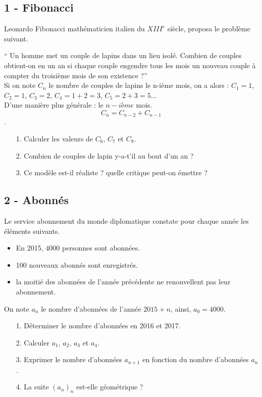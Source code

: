\documentclass[12pt]{article}
\begin{document}
\begin{multicols}{2}
\subsection*{1 - Fibonacci}

Leonardo Fibonacci mathématicien italien du $XIII^e$ siècle, proposa le problème suivant.

`` Un homme met un couple de lapins dans un lieu isolé. Combien de couples obtient-on en un an si chaque couple engendre tous les mois un nouveau couple à compter du troisième mois de son existence ?''\\

Si on note $C_n$ le nombre de couples de lapins le n-ième mois, on a alors : $C_1 = 1$, $C_2 = 1$, $C_3 = 2$, $C_4 = 1 + 2 = 3$, $C_5 = 2 + 3 = 5$...\\
D'une manière plus générale : le $n-ième$ mois.
$$C_n = C_{n-2} + C_{n-1}$$.

\begin{enumerate}
\item[1.] Calculer les valeurs de $C_6$, $C_7$ et $C_8$.
\item[2.] Combien de couples de lapin y-a-t'il au bout d'un an ?
\item[3.] Ce modèle est-il réaliste ? quelle critique peut-on émettre ?
\end{enumerate}

\noindent\hrulefill

\subsection*{2 - Abonnés}

Le service abonnement du monde diplomatique constate pour chaque année les éléments suivants.

\begin{itemize}
\item En 2015, $4000$ personnes sont abonnées.
\item 100 nouveaux abonnés sont enregistrés.
\item la moitié des abonnées de l’année précédente ne renouvellent pas leur abonnement.
\end{itemize}
On note $a_n$ le nombre d’abonnées de l’année $2015 + n$, ainsi, $a_0 = 4000$.

\begin{enumerate}
\item[1.] Déterminer le nombre d’abonnées en 2016 et 2017.
\item[2.] Calculer $a_1$,  $a_2$,  $a_3$ et  $a_4$.
\item[3.] Exprimer le nombre d’abonnées $a_{n+1}$ en fonction du nombre d’abonnées $a_n$.
\item[4.] La suite $(a_n)_n$ est-elle géométrique ? 
\end{enumerate}


\end{multicols}
\end{document}
